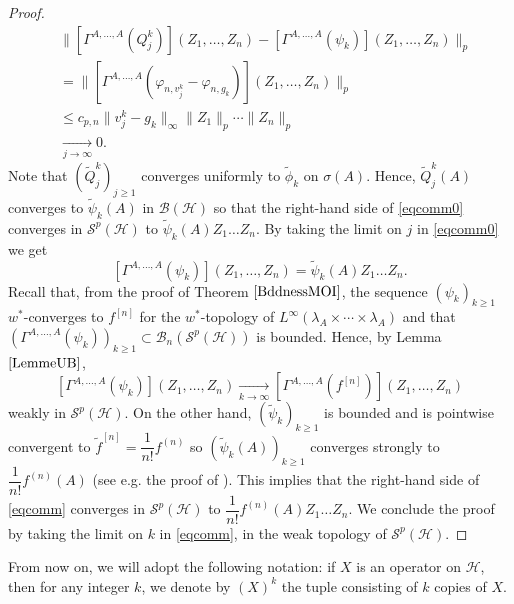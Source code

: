 \documentclass[12pt]{amsart}
\theoremstyle{remark}
\begin{document}
\begin{proof}
\begin{align*}
& \| \left[ \Gamma^{A, \ldots, A}(Q^k_j) \right] (Z_1, \ldots, Z_n) - \left[ \Gamma^{A, \ldots, A}(\psi_k) \right] (Z_1, \ldots, Z_n) \|_p \\
& = \| \left[ \Gamma^{A, \ldots, A}(\varphi_{n, v^k_j} - \varphi_{n, g_k}) \right] (Z_1, \ldots, Z_n) \|_p \\
& \leq c_{p,n} \| v^k_j - g_k\|_{\infty} \|Z_1\|_p \cdots \|Z_n\|_p \\
& \underset{j\to \infty}{\longrightarrow} 0.
\end{align*}
Note that $(\tilde{Q}^k_j)_{j\geq 1}$ converges uniformly to $\tilde{\phi}_k$ on $\sigma(A)$. Hence, $\tilde{Q}^k_j(A)$ converges to $\tilde{\psi}_k(A)$ in $\mathcal{B}(\mathcal{H})$ so that the right-hand side of \eqref{eqcomm0} converges in $\mathcal{S}^p(\mathcal{H})$ to $\tilde{\psi}_k(A)Z_1\ldots Z_n$. By taking the limit on $j$ in \eqref{eqcomm0} we get
\begin{equation}\label{eqcomm}
\left[ \Gamma^{A, \ldots, A}(\psi_k) \right] (Z_1, \ldots, Z_n) = \tilde{\psi}_k(A)Z_1\ldots Z_n.
\end{equation}
Recall that, from the proof of Theorem $\ref{BddnessMOI}$, the sequence $(\psi_k)_{k\geq 1}$ $w^*$-converges to $f^{[n]}$ for the $w^*$-topology of $L^{\infty}(\lambda_A \times \cdots \times \lambda_A)$ and that $(\Gamma^{A, \ldots, A}(\psi_k))_{k\geq 1} \subset \mathcal{B}_n(\mathcal{S}^p(\mathcal{H}))$ is bounded. Hence, by Lemma $\ref{LemmeUB}$,
$$
\left[ \Gamma^{A, \ldots, A}(\psi_k) \right] (Z_1, \ldots, Z_n) \underset{k \to \infty}{\longrightarrow} \left[ \Gamma^{A, \ldots, A}(f^{[n]}) \right] (Z_1, \ldots, Z_n)
$$
weakly in $\mathcal{S}^p(\mathcal{H})$. On the other hand, $(\tilde{\psi}_k)_{k\geq 1}$ is bounded and is pointwise convergent to $\tilde{f}^{[n]}=\dfrac{1}{n!}f^{(n)}$ so $(\tilde{\psi}_k(A))_{k\geq 1}$ converges strongly to $\dfrac{1}{n!} f^{(n)}(A)$ (see e.g. the proof of \cite[Proposition 3.1]{CLSS}). This implies that the right-hand side of \eqref{eqcomm} converges in $\mathcal{S}^p(\mathcal{H})$ to $\dfrac{1}{n!} f^{(n)}(A)Z_1\ldots Z_n.$ We conclude the proof by taking the limit on $k$ in \eqref{eqcomm}, in the weak topology of $\mathcal{S}^p(\mathcal{H})$.

\end{proof}


From now on, we will adopt the following notation: if $X$ is an operator on $\mathcal{H}$, then for any integer $k$, we denote by $(X)^{k}$ the tuple consisting of $k$ copies of $X$.
\end{document}
